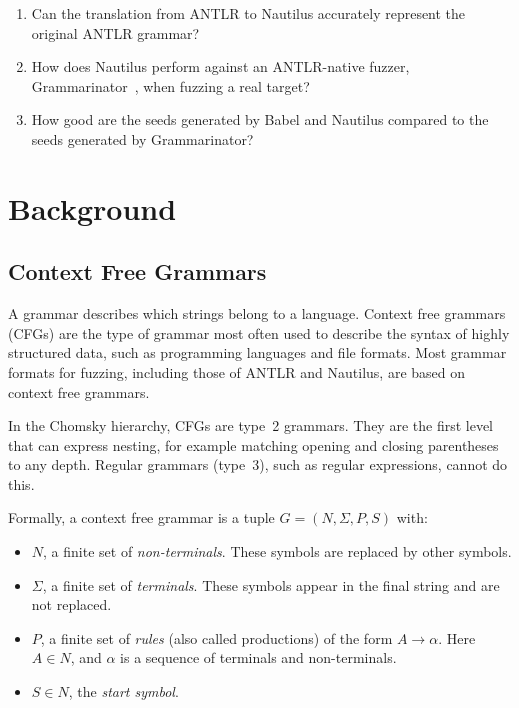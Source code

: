 \documentclass[thesis]{plai}
\begin{document}
\begin{enumerate}
    \item Can the translation from ANTLR to Nautilus accurately represent the original ANTLR grammar?
    \item How does Nautilus perform against an ANTLR-native fuzzer, Grammarinator~\cite{hodovan18-grammarinator,hodovan26-grammarinator-aflpp}, when fuzzing a real target?
    \item How good are the seeds generated by Babel and Nautilus compared to the seeds generated by Grammarinator?
\end{enumerate}

\chapter{Background}
\label{chapter:background}

\section{Context Free Grammars}
\label{section:cfg}
A grammar describes which strings belong to a language. Context free grammars (CFGs) are the type of grammar most often used to describe the syntax of highly structured data, such as programming languages and file formats. Most grammar formats for fuzzing, including those of ANTLR and Nautilus, are based on context free grammars.

In the Chomsky hierarchy, CFGs are type~2 grammars. They are the first level that can express nesting, for example matching opening and closing parentheses to any depth. Regular grammars (type~3), such as regular expressions, cannot do this.

Formally, a context free grammar is a tuple $G = (N, \Sigma, P, S)$ with:
\begin{itemize}
    \item $N$, a finite set of \emph{non-terminals}. These symbols are replaced by other symbols.
    \item $\Sigma$, a finite set of \emph{terminals}. These symbols appear in the final string and are not replaced.
    \item $P$, a finite set of \emph{rules} (also called productions) of the form $A \rightarrow \alpha$. Here $A \in N$, and $\alpha$ is a sequence of terminals and non-terminals.
    \item $S \in N$, the \emph{start symbol}.
\end{itemize}
\end{document}
